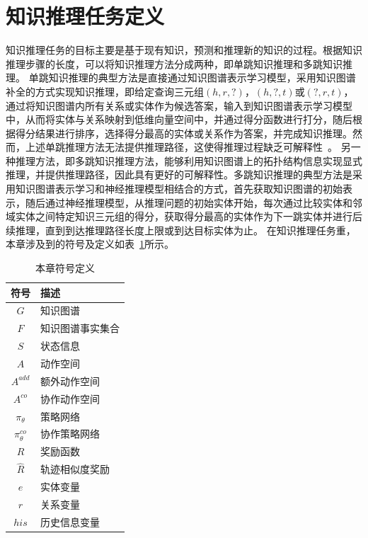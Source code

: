 \documentclass[algorithmlist, AutoFakeBold, AutoFakeSlant, figurelist, tablelist, nomlist, masters]{seuthesix}
\begin{document}
\section{知识推理任务定义}
知识推理任务的目标主要是基于现有知识，预测和推理新的知识的过程。根据知识推理步骤的长度，可以将知识推理方法分成两种，即单跳知识推理和多跳知识推理。
单跳知识推理的典型方法是直接通过知识图谱表示学习模型，采用知识图谱补全的方式实现知识推理，即给定查询三元组$\left(h, r, ?\right)$，$\left(h, ?, t\right)$或$\left(?, r, t\right)$，通过将知识图谱内所有关系或实体作为候选答案，输入到知识图谱表示学习模型中，从而将实体与关系映射到低维向量空间中，并通过得分函数进行打分，随后根据得分结果进行排序，选择得分最高的实体或关系作为答案，并完成知识推理。然而，上述单跳推理方法无法提供推理路径，这使得推理过程缺乏可解释性~\cite{wang2019deeppath}。
另一种推理方法，即多跳知识推理方法，能够利用知识图谱上的拓扑结构信息实现显式推理，并提供推理路径，因此具有更好的可解释性。多跳知识推理的典型方法是采用知识图谱表示学习和神经推理模型相结合的方式，首先获取知识图谱的初始表示，随后通过神经推理模型，从推理问题的初始实体开始，每次通过比较实体和邻域实体之间特定知识三元组的得分，获取得分最高的实体作为下一跳实体并进行后续推理，直到到达推理路径长度上限或到达目标实体为止。
在知识推理任务重，本章涉及到的符号及定义如表~\ref{3_symbols}所示。
\begin{table}
  \centering
  \begin{tabular*}{0.4\textwidth}{@{\extracolsep{\fill}}cl}
		\toprule[1pt]
    符号 & 描述 \\ \hline
    $G$ & 知识图谱\\
    $F$ & 知识图谱事实集合\\
    $S$ & 状态信息\\
    $A$ & 动作空间\\
    $A^{add}$ & 额外动作空间\\
    $A^{co}$ & 协作动作空间\\
    $\pi_\theta$ & 策略网络\\
    $\pi_\theta^{co}$ & 协作策略网络\\
    $R$ & 奖励函数\\
    $\hat{R}$ & 轨迹相似度奖励\\
    $e$ & 实体变量\\
    $r$ & 关系变量\\
    $his$ & 历史信息变量\\
		\bottomrule[1pt]
	\end{tabular*}
  \caption{本章符号定义}
  \label{3_symbols}
\end{table}
\end{document}
